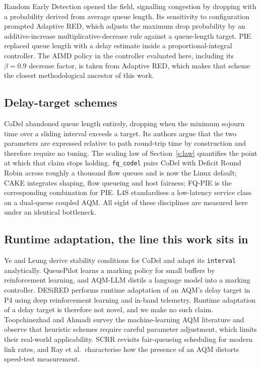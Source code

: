 \documentclass[11pt,a4paper]{article}
\begin{document}
Random Early Detection opened the field, signalling congestion by dropping
with a probability derived from average queue length\cite{red1993}. Its
sensitivity to configuration prompted Adaptive RED, which adjusts the maximum
drop probability by an additive-increase multiplicative-decrease rule against
a queue-length target\cite{ared2001}. PIE replaced queue length with a delay
estimate inside a proportional-integral controller\cite{rfc8033}. The AIMD
policy in the controller evaluated here, including its $\beta=0.9$ decrease
factor, is taken from Adaptive RED, which makes that scheme the closest
methodological ancestor of this work.

\subsection{Delay-target schemes}

CoDel abandoned queue length entirely, dropping when the minimum sojourn time
over a sliding interval exceeds a target\cite{nichols2012,rfc8289}. Its
authors argue that the two parameters are expressed relative to path
round-trip time by construction and therefore require no tuning. The scaling
law of Section~\ref{s:law} quantifies the point at which that claim stops
holding. \texttt{fq\_codel} pairs CoDel with Deficit Round Robin across
roughly a thousand flow queues and is now the Linux default\cite{rfc8290};
CAKE integrates shaping, flow queueing and host fairness\cite{cake2018};
FQ-PIE is the corresponding combination for PIE\cite{fqpie2019}. L4S
standardises a low-latency service class on a dual-queue coupled
AQM\cite{rfc9330,rfc9332}. All eight of these disciplines are measured here
under an identical bottleneck.

\subsection{Runtime adaptation, the line this work sits in}

Ye and Leung derive stability conditions for CoDel and adapt its
\texttt{interval} analytically\cite{yeleung2020}. QueuePilot learns a
marking policy for small buffers by reinforcement
learning\cite{queuepilot2023}, and AQM-LLM distils a language model into a
marking controller\cite{aqmllm2025}. DESiRED performs runtime adaptation of
an AQM's delay target in P4 using deep reinforcement learning and in-band
telemetry\cite{desired2024}. Runtime adaptation of a delay target is
therefore not novel, and we make no such claim. Toopchinezhad and Ahmadi
survey the machine-learning AQM literature and observe that heuristic schemes
require careful parameter adjustment, which limits their real-world
applicability\cite{mlaqm2025}. SCRR revisits fair-queueing scheduling for
modern link rates\cite{scrr2025}, and Ray et al.\ characterise how the
presence of an AQM distorts speed-test measurement\cite{ray2025}.
\end{document}

